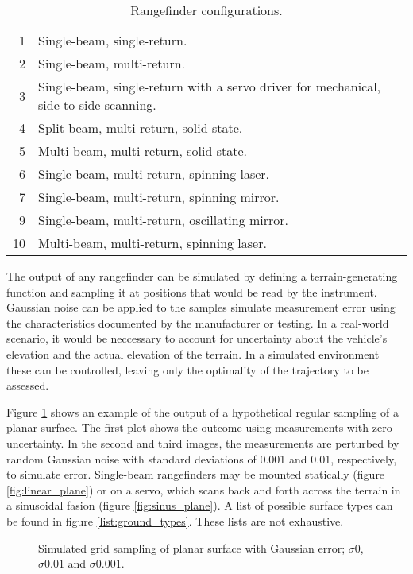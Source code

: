 \documentclass[10pt]{report}
\begin{document}
\begin{table}
\caption{Rangefinder configurations.}
\label{list:rangefinder_configs}
\begin{tabular}{r | l}
\hline
1 & Single-beam, single-return. \\
2 & Single-beam, multi-return. \\
3 & Single-beam, single-return with a servo driver for mechanical, side-to-side scanning. \\
4 & Split-beam, multi-return, solid-state. \\
5 & Multi-beam, multi-return, solid-state. \\
6 & Single-beam, multi-return, spinning laser. \\
7 & Single-beam, multi-return, spinning mirror. \\
9 & Single-beam, multi-return, oscillating mirror. \\
10 & Multi-beam, multi-return, spinning laser. \\
\hline
\end{tabular}
\end{table}


The output of any rangefinder can be simulated by defining a terrain-generating function and sampling it at positions that would be read by the instrument. Gaussian noise can be applied to the samples simulate measurement error using the characteristics documented by the manufacturer or testing. In a real-world scenario, it would be neccessary to account for uncertainty about the vehicle's elevation and the actual elevation of the terrain. In a simulated environment these can be controlled, leaving only the optimality of the trajectory to be assessed.

Figure \ref{fig:point_plane} shows an example of the output of a hypothetical regular sampling of a planar surface. The first plot shows the outcome using measurements with zero uncertainty. In the second and third images, the measurements are perturbed by random Gaussian noise with standard deviations of 0.001 and 0.01, respectively, to simulate error. Single-beam rangefinders may be mounted statically (figure \ref{fig:linear_plane}) or on a servo, which scans back and forth across the terrain in a sinusoidal fasion (figure \ref{fig:sinus_plane}). A list of possible surface types can be found in figure \ref{list:ground_types}. These lists are not exhaustive. 


\begin{figure}
\centering
\def\svgscale{0.25}

\def\svgscale{0.25}

\def\svgscale{0.25}

\caption{Simulated grid sampling of planar surface with Gaussian error; $\sigma 0$, $\sigma 0.01$ and $\sigma 0.001$.}
\label{fig:point_plane}
\end{figure}
\end{document}
